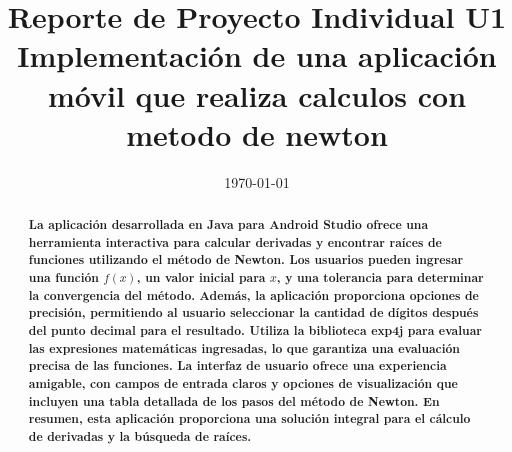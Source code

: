 \documentclass[conference]{IEEEtran}
\date{\specialdate\today}
\begin{document}
%
%
%

\newcommand{\breite}{0.9} %
\newcommand{\RelacionFiguradoscolumnas}{0.9}
\newcommand{\RelacionFiguradoscolumnasPuntoCinco}{0.45}




\title{Reporte de Proyecto Individual U1 \\ Implementación de una aplicación móvil que realiza calculos con metodo de newton
}

\author{
}



\maketitle

\begin{abstract} 
\textbf{La aplicación desarrollada en Java para Android Studio ofrece una herramienta interactiva para calcular derivadas y encontrar raíces de funciones utilizando el método de Newton. Los usuarios pueden ingresar una función \( f(x) \), un valor inicial para \( x \), y una tolerancia para determinar la convergencia del método. Además, la aplicación proporciona opciones de precisión, permitiendo al usuario seleccionar la cantidad de dígitos después del punto decimal para el resultado. Utiliza la biblioteca exp4j para evaluar las expresiones matemáticas ingresadas, lo que garantiza una evaluación precisa de las funciones. La interfaz de usuario ofrece una experiencia amigable, con campos de entrada claros y opciones de visualización que incluyen una tabla detallada de los pasos del método de Newton. En resumen, esta aplicación proporciona una solución integral para el cálculo de derivadas y la búsqueda de raíces.}
\end{abstract}
\end{document}
